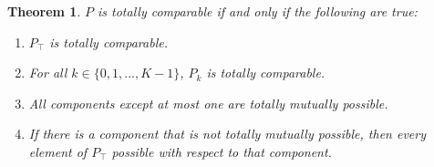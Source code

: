 \documentclass[twoside]{article}
\theoremstyle{plain}%
\newtheorem{theorem}{Theorem}[section]
\theoremstyle{definition}
\theoremstyle{remark}
\begin{document}
\begin{theorem}
\(P\) is totally comparable if and only if the following are true:

\begin{enumerate}
\item \(P_{\top}\) is totally comparable.
\item For all \(k \in \{0, 1, ..., K - 1\}\), \(P_k\) is totally comparable.
\item All components except at most one are totally mutually possible.
\item If there is a component that is not totally mutually possible, then every element of \(P_{\top}\) possible with respect to that component.
\end{enumerate}
\end{theorem}
\end{document}
